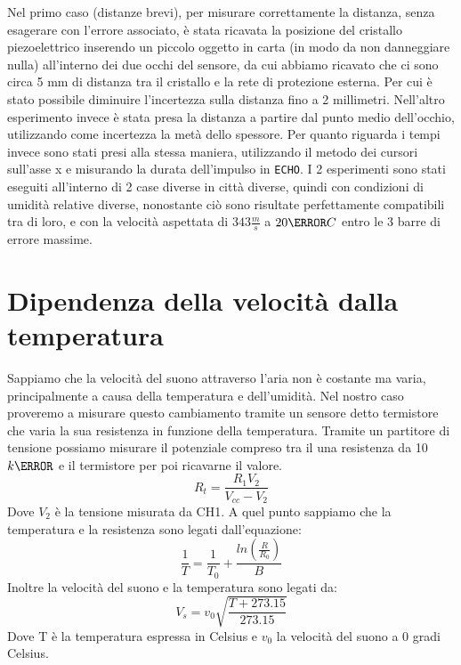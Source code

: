 \documentclass[10pt, a4paper, italian]{article}
\begin{document}
Nel primo caso (distanze brevi), per misurare correttamente la distanza, senza esagerare con l'errore associato, è stata ricavata la posizione del cristallo piezoelettrico inserendo un piccolo oggetto in carta (in modo da non danneggiare nulla) all'interno dei due occhi del sensore, da cui abbiamo ricavato che ci sono circa 5 mm di distanza tra il cristallo e la rete di protezione esterna. Per cui è stato possibile diminuire l'incertezza sulla distanza fino a 2 millimetri. Nell'altro esperimento invece è stata presa la distanza a partire dal punto medio dell'occhio, utilizzando come incertezza la metà dello spessore. Per quanto riguarda i tempi invece sono stati presi alla stessa maniera, utilizzando il metodo dei cursori sull'asse x e misurando la durata dell'impulso in \verb+ECHO+. I 2 esperimenti sono stati eseguiti all'interno di 2 case diverse in città diverse, quindi con condizioni di umidità relative diverse, nonostante ciò sono risultate perfettamente compatibili tra di loro, e con la velocità aspettata di $343 \frac{m}{s}$ a $20 \degree C$ entro le 3 barre di errore massime.
\section{Dipendenza della velocità dalla temperatura}
Sappiamo che la velocità del suono attraverso l'aria non è costante ma varia, principalmente a causa della temperatura e dell'umidità.
Nel nostro caso proveremo a misurare questo cambiamento tramite un sensore detto termistore che varia la sua resistenza in funzione della temperatura.
Tramite un partitore di tensione possiamo misurare il potenziale compreso tra il una resistenza da 10 $k\ohm$ e il termistore per poi ricavarne il valore.
\begin{equation}
R_t=\frac{R_1V_2}{V_{cc}-V_2}
\end{equation}
Dove $V_2$ è la tensione misurata da CH1.
A quel punto sappiamo che la temperatura e la resistenza sono legati dall'equazione:
\begin{equation}
\frac{1}{T}= \frac{1}{T_0} + \frac{ln(\frac{R}{R_0})}{B}
\end{equation}
Inoltre la velocità del suono e la temperatura sono legati da:
\begin{equation}
V_s=v_0\sqrt{\frac{T+273.15}{273.15}}
\end{equation}
Dove T è la temperatura espressa in Celsius e $v_0$ la velocità del suono a 0 gradi Celsius.
\end{document}
